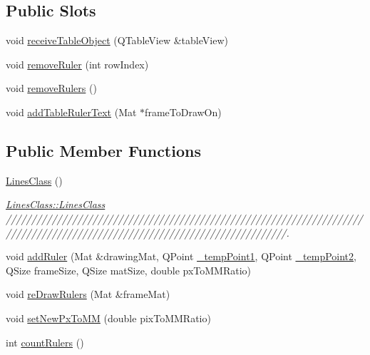 \subsection*{Public Slots}
\begin{DoxyCompactItemize}
\item 
void \mbox{\hyperlink{class_lines_class_a7cbdbb9847cc00cbc64141572c536866}{receive\+Table\+Object}} (Q\+Table\+View \&table\+View)
\item 
void \mbox{\hyperlink{class_lines_class_a714be78a9c85c6ba3c8456e8ee1a5290}{remove\+Ruler}} (int row\+Index)
\item 
void \mbox{\hyperlink{class_lines_class_a6214ae9c3e61143c6ee013e55d346281}{remove\+Rulers}} ()
\item 
void \mbox{\hyperlink{class_lines_class_a40228921775f778a33a391bad2830d1c}{add\+Table\+Ruler\+Text}} (Mat $\ast$frame\+To\+Draw\+On)
\end{DoxyCompactItemize}
\subsection*{Public Member Functions}
\begin{DoxyCompactItemize}
\item 
\mbox{\hyperlink{class_lines_class_a27cc25678359a1897ad8b29390e612cc}{Lines\+Class}} ()
\begin{DoxyCompactList}\small\item\em \mbox{\hyperlink{class_lines_class_a27cc25678359a1897ad8b29390e612cc}{Lines\+Class\+::\+Lines\+Class}} /////////////////////////////////////////////////////////////////////////////////////////////////////////////////////////////. \end{DoxyCompactList}\item 
void \mbox{\hyperlink{class_lines_class_ab61cc7912d5903aec574d53847e7ebf2}{add\+Ruler}} (Mat \&drawing\+Mat, Q\+Point \mbox{\hyperlink{class_lines_class_ae6dfe8a03b4d94cc17486f4020b6ad5e}{\+\_\+temp\+Point1}}, Q\+Point \mbox{\hyperlink{class_lines_class_a6c65dce259446985fdd0c97525e55642}{\+\_\+temp\+Point2}}, Q\+Size frame\+Size, Q\+Size mat\+Size, double px\+To\+M\+M\+Ratio)
\item 
void \mbox{\hyperlink{class_lines_class_a7fad9c7b48f6d55017423ffa9897b071}{re\+Draw\+Rulers}} (Mat \&frame\+Mat)
\item 
void \mbox{\hyperlink{class_lines_class_a27046d1871f85101660c20703d87b1db}{set\+New\+Px\+To\+MM}} (double pix\+To\+M\+M\+Ratio)
\item 
int \mbox{\hyperlink{class_lines_class_a1b656266d53d9364c9969514efd2c878}{count\+Rulers}} ()
\end{DoxyCompactItemize}
